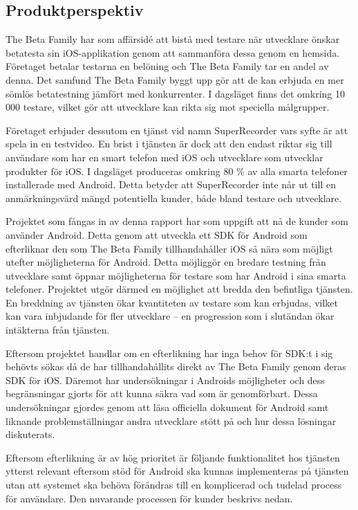 \subsection{Produktperspektiv}
\label{subsec:perspective}

The Beta Family har som affärsidé att bistå med testare när utvecklare önskar betatesta sin iOS-applikation genom att sammanföra dessa genom en hemsida. Företaget betalar testarna en belöning och The Beta Family tar en andel av denna. Det samfund The Beta Family byggt upp gör att de kan erbjuda en mer sömlös betatestning jämfört med konkurrenter. I dagsläget finns det omkring 10 000 testare, vilket gör att utvecklare kan rikta sig mot speciella målgrupper.

 Företaget erbjuder dessutom en tjänst vid namn SuperRecorder vars syfte är att spela in en testvideo. En brist i tjänsten är dock att den endast riktar sig till användare som har en smart telefon med iOS och utvecklare som utvecklar produkter för iOS. I dagsläget produceras omkring 80 \% av alla smarta telefoner installerade med Android\parencite{ http://www.idc.com/getdoc.jsp?containerId=prUS24442013}. Detta betyder att SuperRecorder inte når ut till en anmärkningsvärd mängd potentiella kunder, både bland testare och utvecklare.

Projektet som fångas in av denna rapport har som uppgift att nå de kunder som använder Android. Detta genom att utveckla ett SDK för Android som efterliknar den som The Beta Family tillhandahåller iOS så nära som möjligt utefter möjligheterna för Android. Detta möjliggör en bredare testning från utvecklare samt öppnar möjligheterna för testare som har Android i sina smarta telefoner. Projektet utgör därmed en möjlighet att bredda den befintliga tjänsten. En breddning av tjänsten ökar kvantiteten av testare som kan erbjudas, vilket kan vara inbjudande för fler utvecklare – en progression som i slutändan ökar intäkterna från tjänsten.

Eftersom projektet handlar om en efterlikning har inga behov för SDK:t i sig behövts sökas då de har tillhandahållits direkt av The Beta Family genom deras SDK för iOS. Däremot har undersökningar i Androids möjligheter och dess begränsningar gjorts för att kunna säkra vad som är genomförbart. Dessa undersökningar gjordes genom att läsa officiella dokument för Android samt liknande problemställningar andra utvecklare stött på och hur dessa lösningar diskuterats.

Eftersom efterlikning är av hög prioritet är följande funktionalitet hos tjänsten ytterst relevant eftersom stöd för Android ska kunnas implementeras på tjänsten utan att systemet ska behöva förändras till en komplicerad och tudelad process för användare. Den nuvarande processen för kunder beskrivs nedan.

